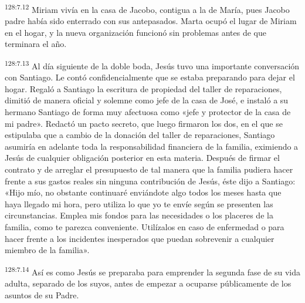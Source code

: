 \par 
\textsuperscript{128:7.12} Miriam vivía en la casa de Jacobo, contigua a la de María, pues Jacobo padre había sido enterrado con sus antepasados. Marta ocupó el lugar de Miriam en el hogar, y la nueva organización funcionó sin problemas antes de que terminara el año.

\par 
\textsuperscript{128:7.13} Al día siguiente de la doble boda, Jesús tuvo una importante conversación con Santiago. Le contó confidencialmente que se estaba preparando para dejar el hogar. Regaló a Santiago la escritura de propiedad del taller de reparaciones, dimitió de manera oficial y solemne como jefe de la casa de José, e instaló a su hermano Santiago de forma muy afectuosa como «jefe y protector de la casa de mi padre». Redactó un pacto secreto, que luego firmaron los dos, en el que se estipulaba que a cambio de la donación del taller de reparaciones, Santiago asumiría en adelante toda la responsabilidad financiera de la familia, eximiendo a Jesús de cualquier obligación posterior en esta materia. Después de firmar el contrato y de arreglar el presupuesto de tal manera que la familia pudiera hacer frente a sus gastos reales sin ninguna contribución de Jesús, éste dijo a Santiago: «Hijo mío, no obstante continuaré enviándote algo todos los meses hasta que haya llegado mi hora, pero utiliza lo que yo te envíe según se presenten las circunstancias. Emplea mis fondos para las necesidades o los placeres de la familia, como te parezca conveniente. Utilízalos en caso de enfermedad o para hacer frente a los incidentes inesperados que puedan sobrevenir a cualquier miembro de la familia».

\par 
\textsuperscript{128:7.14} Así es como Jesús se preparaba para emprender la segunda fase de su vida adulta, separado de los suyos, antes de empezar a ocuparse públicamente de los asuntos de su Padre.
